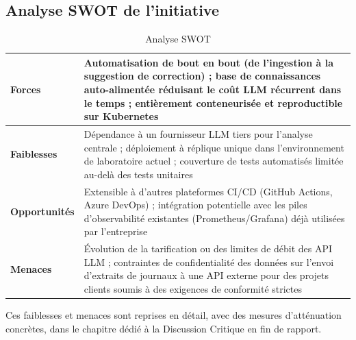 \documentclass[12pt,a4paper,oneside]{report}
\begin{document}
\subsection{Analyse SWOT de l'initiative}
\begin{table}[H]\centering
\caption{Analyse SWOT}\label{tab:swot}
\renewcommand{\arraystretch}{1.3}
\begin{tabularx}{\textwidth}{>{\bfseries\color{primary}}p{3.0cm} Y}
\toprule
{} Forces & Automatisation de bout en bout (de l'ingestion à la suggestion de correction) ; base de connaissances auto-alimentée réduisant le coût LLM récurrent dans le temps ; entièrement conteneurisée et reproductible sur Kubernetes \\
\midrule
Faiblesses & Dépendance à un fournisseur LLM tiers pour l'analyse centrale ; déploiement à réplique unique dans l'environnement de laboratoire actuel ; couverture de tests automatisés limitée au-delà des tests unitaires \\
\midrule
Opportunités & Extensible à d'autres plateformes CI/CD (GitHub Actions, Azure DevOps) ; intégration potentielle avec les piles d'observabilité existantes (Prometheus/Grafana) déjà utilisées par l'entreprise \\
\midrule
Menaces & Évolution de la tarification ou des limites de débit des API LLM ; contraintes de confidentialité des données sur l'envoi d'extraits de journaux à une API externe pour des projets clients soumis à des exigences de conformité strictes \\
\bottomrule
\end{tabularx}
\end{table}
Ces faiblesses et menaces sont reprises en détail, avec des mesures d'atténuation concrètes, dans le chapitre dédié à la Discussion Critique en fin de rapport.
\end{document}

